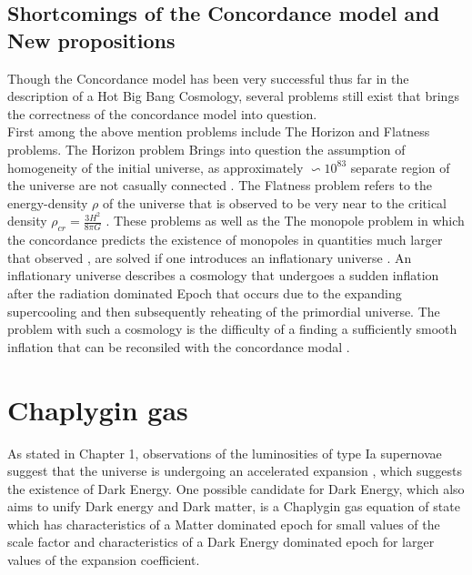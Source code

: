 \documentclass[a4paper, 11pt]{FSKH_623_Report}
\numberwithin{equation}{section}
\begin{document}
\section{Shortcomings of the Concordance model and New propositions}
Though the Concordance model has been very successful thus far in the description of a Hot Big Bang Cosmology, several problems still exist that brings the correctness of the concordance model into question. \\
First among the above mention problems include The Horizon and Flatness problems. The Horizon problem Brings into question the assumption of homogeneity of the initial universe, as approximately $\backsim 10^{83}$ separate region of the universe are not casually connected \citep{IU}. The Flatness problem refers to the   energy-density $\rho$ of the universe that is observed to be very near to the critical density $\rho_{cr}=\frac{3H^{2}}{8\pi G}$ \citep{GRES, IU}. These problems as well as the The monopole problem in which the concordance predicts the existence of monopoles in quantities much larger that observed , are solved if one introduces an inflationary universe \citep{IU}. An inflationary universe describes a cosmology that undergoes a sudden inflation after the radiation dominated Epoch that occurs due to the expanding supercooling and then subsequently reheating of the primordial universe. The problem with such a cosmology is the difficulty of a finding a sufficiently smooth inflation that can be reconsiled with the concordance modal \citep{IU}.\\

\chapter{Chaplygin gas}
As stated in Chapter 1, observations of the luminosities of type Ia supernovae suggest that the universe is undergoing an accelerated expansion \citep{NPSNe, RMCGAU}, which suggests the existence of Dark Energy. One possible candidate for Dark Energy, which also aims to unify Dark energy and Dark matter, is a Chaplygin gas equation of state which has characteristics of a Matter dominated epoch for small values of the scale factor and characteristics of a Dark Energy dominated epoch for larger values of the expansion coefficient.
\end{document}
